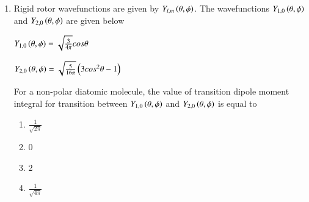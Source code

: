 \documentclass[journal,12pt,onecolumn]{IEEEtran}
\theoremstyle{remark}
\begin{document}
\begin{enumerate}
\item Rigid rotor wavefunctions are given by $Y_{l,m}\left(\theta,\phi\right)$. The wavefunctions $Y_{1,0}\left(\theta, \phi\right)$ and $Y_{2,0}\left(\theta,\phi\right)$ are given below
    \begin{center}
        $Y_{1,0}\left(\theta, \phi\right) = \sqrt{\frac{3}{4\pi}}cos \theta$
       
        $Y_{2,0}\left(\theta,\phi\right) = \sqrt{\frac{5}{16\pi}}\left(3 cos^{2}\theta - 1\right)$
    \end{center}
    For a non-polar diatomic molecule, the value of transition dipole moment integral for transition between $Y_{1,0}\left(\theta, \phi\right)$ and $Y_{2,0}\left(\theta,\phi\right)$ is equal to
    \begin{enumerate}
        \item $\frac{1}{\sqrt{2\pi}}$
        \item 0
        \item 2
        \item $\frac{1}{\sqrt{4\pi}}$
    \end{enumerate}      \hfill{}




\end{enumerate}
\end{document}
